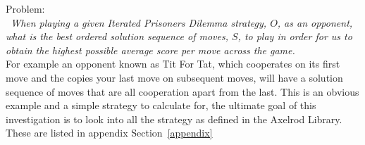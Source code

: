 Problem:\\{\itshape~When playing a given Iterated Prisoners Dilemma strategy, \(O\), as an opponent, what is the best ordered solution sequence of moves, \(S\), to play in order for us to obtain the highest possible average score per move across the game.}\\

For example an opponent known as Tit For Tat, which cooperates on its first move and the copies your last move on subsequent moves, will have a solution sequence of moves that are all cooperation apart from the last.
This is an obvious example and a simple strategy to calculate for, the ultimate goal of this investigation is to look into all the strategy as defined in the Axelrod Library.
These are listed in appendix Section~\ref{appendix}
